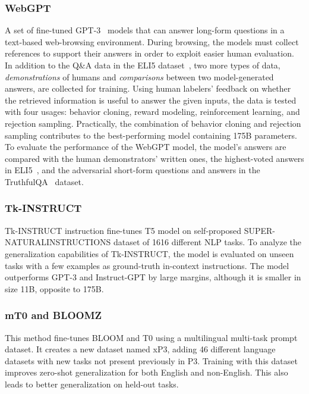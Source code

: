 \subsubsection{WebGPT~\cite{nakano2021webgpt}}
A set of fine-tuned GPT-3~\cite{GPT-3} models that can answer long-form questions in a text-based web-browsing environment. During browsing, the models must collect references to support their answers in order to exploit easier human evaluation. In addition to the Q\&A data in the ELI5 dataset~\cite{fan2019eli5}, two more types of data, \emph{demonstrations} of humans and \emph{comparisons} between two model-generated answers, are collected for training. Using human labelers' feedback on whether the retrieved information is useful to answer the given inputs, the data is tested with four usages: behavior cloning, reward modeling, reinforcement learning, and rejection sampling. Practically, the combination of behavior cloning and rejection sampling contributes to the best-performing model containing 175B parameters. To evaluate the performance of the WebGPT model, the model's answers are compared with the human demonstrators' written ones, the highest-voted answers in ELI5~\cite{fan2019eli5}, and the adversarial short-form questions and answers in the TruthfulQA~\cite{lin2021truthfulqa} dataset.

\subsubsection{Tk-INSTRUCT~\cite{Tk-INSTRUCT}}
Tk-INSTRUCT instruction fine-tunes T5 model on self-proposed SUPER-NATURALINSTRUCTIONS dataset of 1616 different NLP tasks. To analyze the generalization capabilities of Tk-INSTRUCT, the model is evaluated on unseen tasks with a few examples as ground-truth in-context instructions. The model outperforms GPT-3 and Instruct-GPT by large margins, although it is smaller in size 11B, opposite to 175B.   

\subsubsection{mT0 and BLOOMZ~\cite{mT0andBLOOMZ}}
This method fine-tunes BLOOM and T0 using a multilingual multi-task prompt dataset. It creates a new dataset named xP3, adding 46 different language datasets with new tasks not present previously in P3. Training with this dataset improves zero-shot generalization for both English and non-English. This also leads to better generalization on held-out tasks.    


